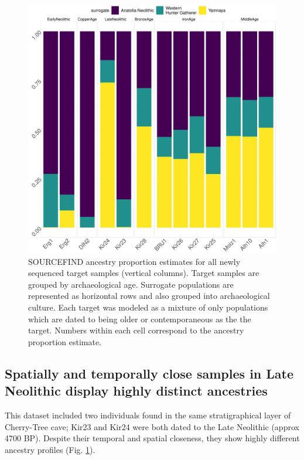 \begin{figure}[htp]
    \centering
    \includegraphics[width=1.0\textwidth]{../images/chapter4/plots3PopBarlot.pdf}
    \caption{SOURCEFIND ancestry proportion estimates for all newly sequenced target samples (vertical columns). Target samples are grouped by archaeological age. Surrogate populations are represented as horizontal rows and also grouped into archaeological culture. Each target was modeled as a mixture of only populations which are dated to being older or contemporaneous as the the target. Numbers within each cell correspond to the ancestry proportion estimate.}
    \label{fig:plots3PopBarlot}
\end{figure}

\subsection{Spatially and temporally close samples in Late Neolithic display highly distinct ancestries}

This dataset included two individuals found in the same stratigraphical layer of Cherry-Tree cave; Kir23 and Kir24 were both dated to the Late Neolithic (approx 4700 BP). Despite their temporal and spatial closeness, they show highly different ancestry profiles (Fig. \ref{fig:plots3PopBarlot}). 

